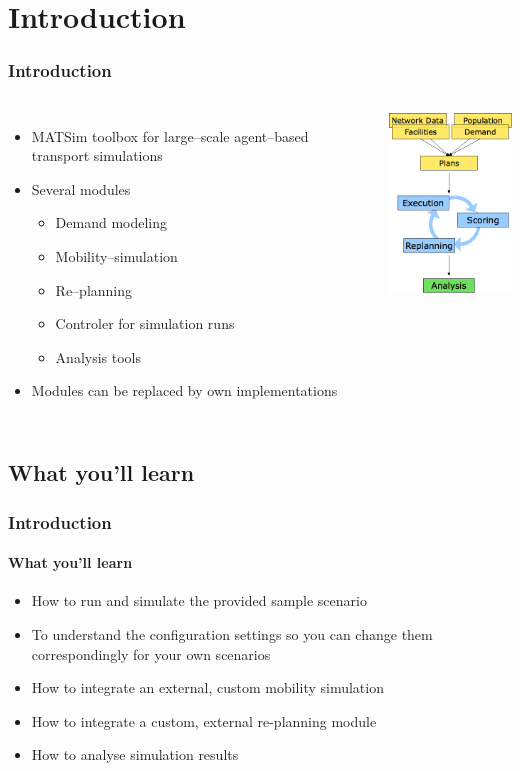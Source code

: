\section{Introduction}
\begin{frame}
\frametitle{Introduction}
\begin{columns}[T]

\column{7cm}

\begin{itemize}
  \item MATSim toolbox for large--scale agent--based transport simulations
  \item Several modules
  \begin{itemize}
  	\item Demand modeling
  	\item Mobility--simulation
  	\item Re--planning
  	\item Controler for simulation runs
  	\item Analysis tools
  \end{itemize}
  \item Modules can be replaced by own implementations
\end{itemize}

\column{5cm}
\includegraphics[width=4cm]{../graphics/overviewMatsim.png}
\end{columns}


\end{frame}


\subsection{What you'll learn}

\begin{frame}
\frametitle{Introduction}
\framesubtitle{What you'll learn}
\begin{itemize}
  \item How to run and simulate the provided sample scenario
  \item To understand the configuration settings so you can change them correspondingly for your own scenarios
  \item How to integrate an external, custom mobility simulation
  \item How to integrate a custom, external re-planning module
  \item How to analyse simulation results
\end{itemize}
\end{frame}

